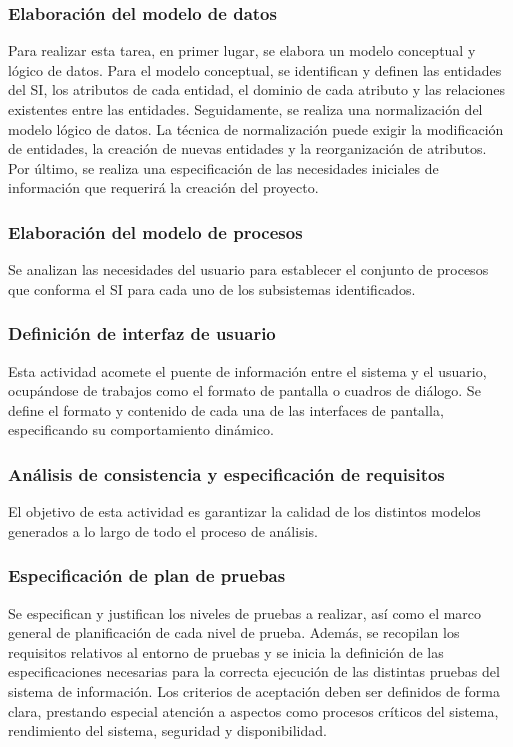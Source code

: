 \documentclass[11pt,a4paper,spanish,twoside]{book}
\begin{document}
\subsubsection{Elaboración del modelo de datos}
Para realizar esta tarea, en primer lugar, se elabora un modelo conceptual y 
lógico de datos. Para el modelo conceptual, se identifican y definen las 
entidades del SI, los atributos de cada entidad, el dominio de cada atributo y 
las relaciones existentes entre las entidades. Seguidamente, se realiza una 
normalización del modelo lógico de datos. La técnica de normalización puede 
exigir la modificación de entidades, la creación de nuevas entidades y la 
reorganización de atributos. Por último, se realiza una especificación de las 
necesidades iniciales de información que requerirá la creación del proyecto.

\subsubsection{Elaboración del modelo de procesos}
Se analizan las necesidades del usuario para establecer el conjunto de procesos
que conforma el SI para cada uno de los subsistemas identificados.

\subsubsection{Definición de interfaz de usuario}
Esta actividad acomete el puente de información entre el sistema y el usuario, 
ocupándose de trabajos como el formato de pantalla o cuadros de diálogo. Se 
define el formato y contenido de cada una de las interfaces de pantalla, 
especificando su comportamiento dinámico.

\subsubsection{Análisis de consistencia y especificación de requisitos}
El objetivo de esta actividad es garantizar la calidad de los distintos modelos
generados a lo largo de todo el proceso de análisis.

\subsubsection{Especificación de plan de pruebas}
Se especifican y justifican los niveles de pruebas a realizar, así como el 
marco general de planificación de cada nivel de prueba. Además, se recopilan 
los requisitos relativos al entorno de pruebas y se inicia la definición de las
especificaciones necesarias para la correcta ejecución de las distintas
pruebas del sistema de información. Los criterios de aceptación deben
ser definidos de forma clara, prestando especial atención a aspectos como
procesos críticos del sistema, rendimiento del sistema, seguridad y 
disponibilidad.
\end{document}
